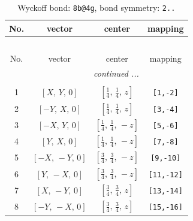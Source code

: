 \documentclass[fleqn,8pt]{jsarticle}
\begin{document}
\begin{longtable}{cccc}
\caption{Wyckoff bond: {\tt 8b@4g}, bond symmetry: {\tt 2..}}
 \\
 \hline \hline
No. & vector & center & mapping \\ \hline \endfirsthead

\multicolumn{3}{l}{\tablename\ \thetable{}} \\
 \hline \hline
No. & vector & center & mapping \\ \hline \endhead

 \hline \hline
\multicolumn{3}{r}{\footnotesize\it continued ...} \\ \endfoot

 \hline \hline
\multicolumn{3}{r}{} \\ \endlastfoot

1 & $\left[ X,\, Y,\, 0 \right]$ & $\left[ \frac{1}{4},\, \frac{1}{4},\, z \right]$ & {\tt [1,-2]} \\ \hline
2 & $\left[ - Y,\, X,\, 0 \right]$ & $\left[ \frac{1}{4},\, \frac{1}{4},\, z \right]$ & {\tt [3,-4]} \\ \hline
3 & $\left[ - X,\, Y,\, 0 \right]$ & $\left[ \frac{1}{4},\, \frac{1}{4},\, - z \right]$ & {\tt [5,-6]} \\ \hline
4 & $\left[ Y,\, X,\, 0 \right]$ & $\left[ \frac{1}{4},\, \frac{1}{4},\, - z \right]$ & {\tt [7,-8]} \\ \hline
5 & $\left[ - X,\, - Y,\, 0 \right]$ & $\left[ \frac{3}{4},\, \frac{3}{4},\, - z \right]$ & {\tt [9,-10]} \\ \hline
6 & $\left[ Y,\, - X,\, 0 \right]$ & $\left[ \frac{3}{4},\, \frac{3}{4},\, - z \right]$ & {\tt [11,-12]} \\ \hline
7 & $\left[ X,\, - Y,\, 0 \right]$ & $\left[ \frac{3}{4},\, \frac{3}{4},\, z \right]$ & {\tt [13,-14]} \\ \hline
8 & $\left[ - Y,\, - X,\, 0 \right]$ & $\left[ \frac{3}{4},\, \frac{3}{4},\, z \right]$ & {\tt [15,-16]} \\
\end{longtable}
\renewcommand{\arraystretch}{1.2}
\end{document}
